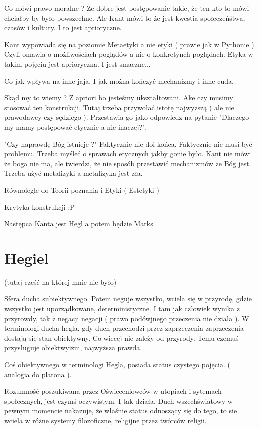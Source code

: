 \documentclass[11pt]{article}
\begin{document}
Co mówi prawo moralne ? Że dobre jest postępowanie takie, że ten kto to mówi chciałby by było powszechne. Ale Kant mówi to że jest kwestia społeczeńśtwa, czasów i kultury. I to jest aprioryczne.

Kant wypowiada się na poziomie Metaetyki a nie etyki ( prawie jak w Pythonie ). Czyli omawia o możliwościach poglądów a nie o konkretynch poglądach. Etyka w takim pojęciu jest aprioryczna. I jest smaczne...

Co jak wpływa na inne jaja. I jak można kończyć mechanizmy i inne cuda. 

Skąd my to wiemy ? Z apriori bo jesteśmy ukształtowani. Ake czy musimy stosować ten konstrukcji. Tutaj trzeba przywołać istotę najwyższą ( ale nie prawodawcy czy sędziego ). Przestawia go jako odpowiedz na pytanie "Dlaczego my mamy postępować etycznie a nie inaczej?".

"Czy naprawdę Bóg istnieje ?" Faktycznie nie doi końca. Faktycznie nie musi być problemu. Trzeba myśleć o sprawach etycznych jakby gonie było. Kant nie mówi że boga nie ma, ale twierdzi, że nie sposób przestawić mechanizmów że Bóg jest. Trzeba użyć metafizyki a metafizyka jest zła.

Równolegle do Teorii poznania i Etyki ( Estetyki )

Krytyka konstrukcji :P

Następca Kanta jest Hegl a potem będzie Marks 

\section{Hegiel}
(tutaj cześć na której mnie nie było)

Sfera ducha subiektywnego. Potem neguje wszystko, wciela się w przyrodę, gdzie wszystko jest uporządkowane, deterministyczne. I tam jak człowiek wynika z przyrowdy, tak z negacji negacji ( prawo podówjnego przeczenia nie działa ). W terminologi ducha hegla, gdy duch przechodzi przez zaprzeczenia zaprzeczenia dostają się stan obiektywny. Co wiecej nie zależy od przyrody. Temu czemuś przysługuje obiektwyizm, najwyższa prawda.

Coś obiektywnego w terminologi Hegla, posiada status czystego pojęcia. ( analogia do platona ). 

Rozumność poszukiwana przez Oświeceniowców w utopiach i sytemach społecznych, jest czymś oczywistym. I tak działa. Duch wszechświatowy w pewnym momencie nakazuje, że właśnie status odnoszący się do tego, to sie wciela w różne systemy filozoficzne, religijne przez twórców religii. 
\end{document}
